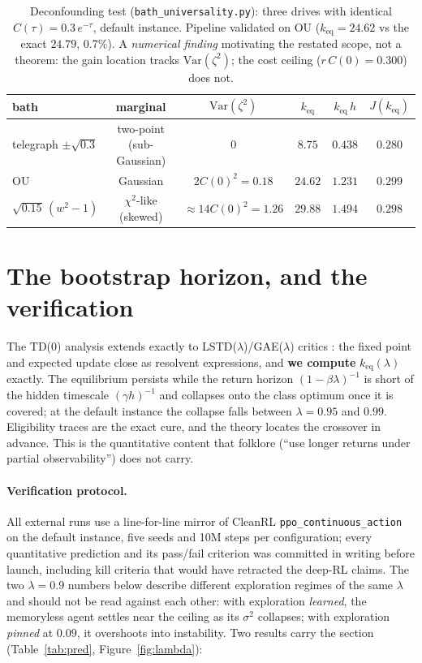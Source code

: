\documentclass[11pt]{article}
\newcommand{\keq}{k_{\mathrm{eq}}}
\begin{document}
\begin{table}[t]
\centering
\caption{Deconfounding test (\texttt{bath\_universality.py}): three drives with identical
$C(\tau)=0.3\,e^{-\tau}$, default instance. Pipeline validated on OU ($\keq = 24.62$ vs the
exact $24.79$, 0.7\%). A \emph{numerical finding} motivating the restated scope, not a theorem:
the gain location tracks $\mathrm{Var}(\zeta^2)$; the cost ceiling ($r\,C(0)=0.300$) does not.}
\label{tab:bath}
\small
\begin{tabular}{lccccc}
\toprule
bath & marginal & $\mathrm{Var}(\zeta^2)$ & $\keq$ & $\keq\,h$ & $J(\keq)$ \\
\midrule
telegraph $\pm\sqrt{0.3}$ & two-point (sub-Gaussian) & $0$ & $8.75$ & $0.438$ & $0.280$ \\
OU & Gaussian & $2C(0)^2 = 0.18$ & $24.62$ & $1.231$ & $0.299$ \\
$\sqrt{0.15}\,(w^2{-}1)$ & $\chi^2$-like (skewed) & $\approx 14C(0)^2 = 1.26$ & $29.88$ & $1.494$ & $0.298$ \\
\bottomrule
\end{tabular}
\end{table}

\section{The bootstrap horizon, and the verification}

The TD(0) analysis extends exactly to LSTD($\lambda$)/GAE($\lambda$) critics
\cite{sutton88,lstd,boyan,gae}: the fixed point and expected update close as resolvent
expressions, and \textbf{we compute} $\keq(\lambda)$ exactly. The equilibrium persists while
the return horizon $(1-\beta\lambda)^{-1}$ is short of the hidden timescale $(\gamma h)^{-1}$
and collapses onto the class optimum once it is covered; at the default instance the collapse
falls between $\lambda = 0.95$ and $0.99$. Eligibility traces are the exact cure, and the theory
locates the crossover in advance. This is the quantitative content that folklore (``use longer
returns under partial observability'') does not carry.

\paragraph{Verification protocol.} All external runs use a line-for-line mirror of CleanRL
\texttt{ppo\_continuous\_action} \cite{ppo,cleanrl} on the default instance, five seeds and 10M
steps per configuration; every quantitative prediction and its pass/fail criterion was
committed in writing before launch, including kill criteria that would have retracted the
deep-RL claims. The two $\lambda = 0.9$ numbers below describe different exploration regimes of
the same $\lambda$ and should not be read against each other: with exploration \emph{learned},
the memoryless agent settles near the ceiling as its $\sigma^2$ collapses; with exploration
\emph{pinned} at $0.09$, it overshoots into instability. Two results carry the section
(Table~\ref{tab:pred}, Figure~\ref{fig:lambda}):
\end{document}
